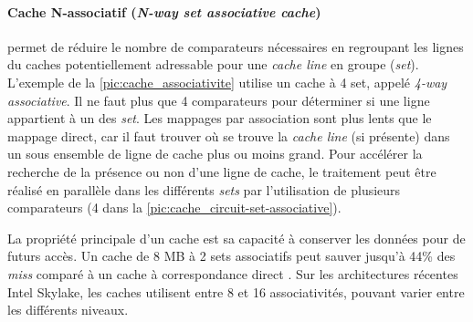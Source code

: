 \paragraph{Cache N-associatif (\textit{N-way set associative cache})} permet de réduire le nombre de comparateurs nécessaires en regroupant les lignes du caches potentiellement adressable pour une \textit{cache line} en groupe (\textit{set}). L'exemple de la \autoref{pic:cache_associativite} utilise un cache à 4 set, appelé \textit{4-way associative}. Il ne faut plus que 4 comparateurs pour déterminer si une ligne appartient à un des \textit{set}. Les mappages par association sont plus lents que le mappage direct, car il faut trouver où se trouve la \textit{cache line} (si présente) dans un sous ensemble de ligne de cache plus ou moins grand. Pour accélérer la recherche de la présence ou non d'une ligne de cache, le traitement peut être réalisé en parallèle dans les différents \textit{sets} par l'utilisation de plusieurs comparateurs (4 dans la \autoref{pic:cache_circuit-set-associative}). 

La propriété principale d'un cache est sa capacité à conserver les données pour de futurs accès. Un cache de 8 MB à 2 sets associatifs peut sauver jusqu'à 44\% des \textit{miss} comparé à un cache à correspondance direct \cite{Drepper2007}. Sur les architectures récentes Intel Skylake, les caches utilisent entre 8 et 16 associativités, pouvant varier entre les différents niveaux. 



